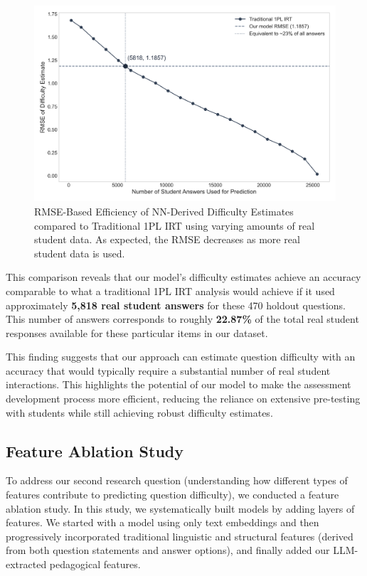 \documentclass[
    a4paper, %
    10pt, %
    twoside, %
]{LTJournalArticle}
\begin{document}
\begin{figure}[H]
    \centering
    \includegraphics[width=1\columnwidth]{figures/rmse_efficiency_curve.png}
    \caption{RMSE-Based Efficiency of NN-Derived Difficulty Estimates compared to Traditional 1PL IRT using varying amounts of real student data. As expected, the RMSE decreases as more real student data is used.}
    \label{fig:rmse-efficiency}
\end{figure}

This comparison reveals that our model's difficulty estimates achieve an accuracy comparable to what a traditional 1PL IRT analysis would achieve if it used approximately \textbf{5,818 real student answers} for these 470 holdout questions. This number of answers corresponds to roughly \textbf{22.87\%} of the total real student responses available for these particular items in our dataset.

This finding suggests that our approach can estimate question difficulty with an accuracy that would typically require a substantial number of real student interactions. This highlights the potential of our model to make the assessment development process more efficient, reducing the reliance on extensive pre-testing with students while still achieving robust difficulty estimates.

\subsection{Feature Ablation Study}
To address our second research question (understanding how different types of features contribute to predicting question difficulty), we conducted a feature ablation study. In this study, we systematically built models by adding layers of features. We started with a model using only text embeddings and then progressively incorporated traditional linguistic and structural features (derived from both question statements and answer options), and finally added our LLM-extracted pedagogical features. 
\end{document}
